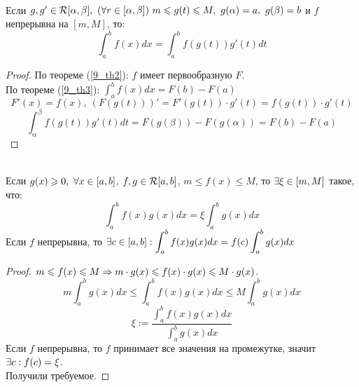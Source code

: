 \begin{theorem}\\
	Если $g,g'\in\mathcal R[\alpha,\beta],\ (\forall r\in[\alpha,\beta])\ m\leqslant g(t)\leqslant M,\ g(\alpha)=a,\ g(\beta)=b$ и $f$ непрерывна на $[m,M]$, то:
	\[\int_a^bf(x)dx=\int_a^bf(g(t))g'(t)dt\]
\end{theorem}
\begin{proof}
	По теореме (\ref{9_th2}): $f$ имеет первообразную $F$.\\
	По теореме (\ref{9_th3}): $\displaystyle\int_a^bf(x)dx=F(b)-F(a)$
	\[F'(x)=f(x),\ (F(g(t)))'=F'(g(t))\cdot g'(t)=f(g(t))\cdot g'(t)\]
	\[\int_\alpha^\beta f(g(t))g'(t)dt=F(g(\beta))-F(g(\alpha))=F(b)-F(a)\]
\end{proof}
\begin{theorem}\\
	Если $g(x)\geqslant0,\ \forall x\in[a,b]$, $f,g\in\mathcal R[a,b]$, $m\le f(x)\le M$, то $\exists\xi\in[m,M]$ такое, что:
	\[\int_a^bf(x)g(x)dx=\xi\int_a^bg(x)dx\]
	Если $f$ непрерывна, то $\displaystyle\exists c\in[a,b]:\int_a^bf(x)g(x)dx=f(c)\int_a^bg(x)dx$
\end{theorem}
\begin{proof}
	$m\leqslant f(x)\leqslant M\Rightarrow m\cdot g(x)\leqslant f(x)\cdot g(x)\leqslant M\cdot g(x)$.
	\[m\int_a^b g(x)dx\le\int_a^b f(x)g(x)dx\le M\int_a^bg(x)dx\]
	\[\xi:=\frac{\int_a^bf(x)g(x)dx}{\int_a^bg(x)dx}\]
	Если $f$ непрерывна, то $f$ принимает все значения на промежутке, значит $\exists c:f(c)=\xi$.\\
	Получили требуемое.
\end{proof}